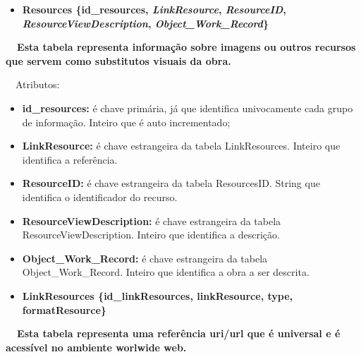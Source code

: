 \documentclass[letterpaper]{article}
\newcommand\textstyleStrongEmphasis[1]{\textbf{#1}}
\newcommand\liststyleLi{%
\renewcommand\labelitemi{{\textbullet}}
\renewcommand\labelitemii{[27A2?]}
\renewcommand\labelitemiii{{\textbullet}}
\renewcommand\labelitemiv{{\textbullet}}
}
\newcommand\liststyleLvi{%
\renewcommand\labelitemi{[27A2?]}
\renewcommand\labelitemii{[27A2?]}
\renewcommand\labelitemiii{[27A2?]}
\renewcommand\labelitemiv{[27A2?]}
}
\begin{document}
\bigskip

\liststyleLi
\begin{itemize}
\item {\bfseries
Resources\textmd{ \{}\textmd{id\_resources}\textmd{,
}\textmd{\textit{LinkResource}}\textmd{,
}\textmd{\textit{ResourceID}}\textmd{,
}\textmd{\textit{ResourceViewDescription}}\textmd{,
}\textmd{\textit{Object\_Work\_Record}}\textmd{\}}}
\end{itemize}
{\bfseries
\foreignlanguage{english}{\textmd{\ \ Esta
}}\textstyleStrongEmphasis{\foreignlanguage{english}{\textmd{tabela}}}\foreignlanguage{english}{\textmd{
representa informa\c{c}\~ao sobre imagens ou outros recursos que servem
como substitutos visuais da obra.}}}


\bigskip

{
\ \ Atributos:}

\liststyleLvi
\begin{itemize}
\item {
\textbf{id\_}\textbf{resources}\textbf{:} \'e chave prim\'aria, j\'a que
identifica univocamente cada grupo de informa\c{c}\~ao. Inteiro que \'e
auto incrementado;}
\item {
\textbf{LinkResource}\textbf{:} \'e chave estrangeira da tabela
LinkResources. Inteiro que identifica a refer\^encia.}
\item {
\textbf{ResourceID:}\textbf{\textit{ }}\'e chave estrangeira da tabela
ResourcesID. String que identifica o identificador do recurso.}
\item {
\textbf{ResourceViewDescription: }\'e chave estrangeira da tabela
ResourceViewDescription. Inteiro que identifica a descri\c{c}\~ao.}
\item {
\textbf{Object\_Work\_Record:}\textit{ }\'e chave estrangeira da tabela
Object\_Work\_Record. Inteiro que identifica a obra a ser descrita.}
\end{itemize}

\bigskip

\liststyleLi
\begin{itemize}
\item {\bfseries
LinkResources\textmd{ \{}\textmd{id\_linkResources}\textmd{,
linkResource, type, formatResource\}}}
\end{itemize}
{\bfseries
\foreignlanguage{english}{\textmd{\ \ Esta
}}\textstyleStrongEmphasis{\foreignlanguage{english}{\textmd{tabela}}}\foreignlanguage{english}{\textmd{
representa uma refer\^encia uri/url que \'e universal e \'e acess\'ivel
no ambiente worlwide web}}\foreignlanguage{english}{\textmd{.}}}
\end{document}
